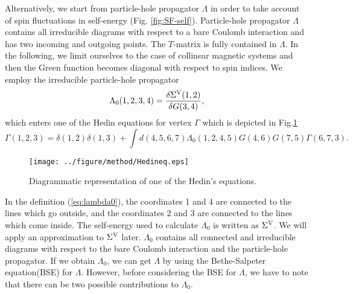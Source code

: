 Alternatively, we start from particle-hole propagator $\Lambda$ in order to 
take account of spin fluctuations in self-energy (Fig. \ref{fig:SF-self}).
Particle-hole propagator $\Lambda$ contains all irreducible 
diagrams with respect to a bare Coulomb interaction and has two 
incoming and outgoing points. The $T$-matrix is fully contained in $\Lambda$.
In the following, we limit ourselves to the case of collinear magnetic systems and 
then the Green function becomes diagonal with respect to spin indices.
We employ the irreducible particle-hole propagator\cite{Arya2008}
%
\begin{equation}
	\Lambda_0(1,2,3,4) = \frac{\delta\Sigma^{\rm V}(1,2)}{\delta G(3,4)},
	\label{eq:lambda0}
\end{equation}
%
which enters one of the Hedin equations for vertex $\Gamma$\cite{Sole1994} which is depicted in Fig.\ref{fig:Hedineq}
%
\begin{equation}
	\Gamma(1,2,3) = \delta(1,2)\delta(1,3) + 
	\int d(4,5,6,7)\Lambda_0(1,2,4,5)
	G(4,6)G(7,5)\Gamma(6,7,3).
	\label{eq:Hedineq}
\end{equation}
%
\begin{figure} %
	\centering
	\texttt{[image: ../figure/method/Hedineq.eps]}
	\caption{Diagrammatic representation of one of the Hedin's equations.}
	\label{fig:Hedineq}
\end{figure}
In the definition (\ref{eq:lambda0}), the coordinates 1 and 4 are connected to the lines which go outside,
and the coordinates 2 and 3 are connected to the lines which come inside.
The self-energy used to calculate $\Lambda_0$ is written as $\Sigma^{\rm V}$.
We will apply an approximation to $\Sigma^{\rm V}$ later.
$\Lambda_0$ contains all connected and irreducible diagrams with
respect to the bare Coulomb interaction and the particle-hole propagator.
If we obtain $\Lambda_0$, we can get $\Lambda$ by using the
Bethe-Salpeter equation(BSE)\cite{BSE1951} for $\Lambda$.
However, before considering the BSE for $\Lambda$, we have to note that
there can be two possible contributions to $\Lambda_0$.

